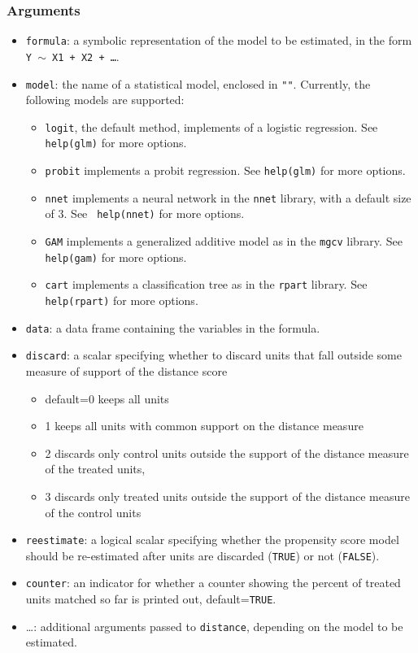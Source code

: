 \documentclass[oneside,letterpaper,titlepage]{article}
\begin{document}
\begin{appendix}
\subsubsection{Arguments}
\begin{itemize}
\item{\texttt{formula}}: a symbolic representation of the model to be
  estimated, in the form {\tt Y $\sim$ X1 + X2 + \dots}.
\item \texttt{model}: the name of a statistical model, enclosed in {\tt ""}.
  Currently, the following models are supported:
  \begin{itemize}
  \item \texttt{logit}, the default method, implements of a logistic
    regression.  See {\tt help(glm)} for more options.
  \item \texttt{probit} implements a probit regression.  See
    {\tt help(glm)} for more options. 
  \item \texttt{nnet} implements a neural network in the
    \texttt{nnet} library, with a default size of 3.  See {\tt
      help(nnet)} for more options.
  \item \texttt{GAM} implements a generalized additive model 
    as in the \texttt{mgcv} library.  See
    {\tt help(gam)} for more options.
  \item \texttt{cart} implements a classification tree as in the
    \texttt{rpart} library.  See {\tt help(rpart)} for more
    options.  
  \end{itemize}
\item \texttt{data}: a data frame containing the variables in the formula.
\item \texttt{discard}: a scalar specifying whether to discard units that fall
  outside some measure of support of the distance score
  \begin{itemize}
  \item default=0 keeps all units
  \item  1 keeps all units with common support on the distance
    measure
  \item 2 discards only control units outside the support of the
    distance measure of the treated units,
  \item 3 discards only treated units outside the support of the
    distance measure of the control units
  \end{itemize}
\item \texttt{reestimate}: a logical scalar specifying whether the propensity
  score model should be re-estimated after units are discarded
  (\texttt{TRUE}) or not (\texttt{FALSE}).
\item \texttt{counter}: an indicator for whether a counter showing the percent of treated units matched so far is printed out, default={\tt TRUE}.
\item{\dots}: additional arguments passed to \texttt{distance}, depending on
    the model to be estimated.
\end{itemize}


\end{appendix}
\end{document}

